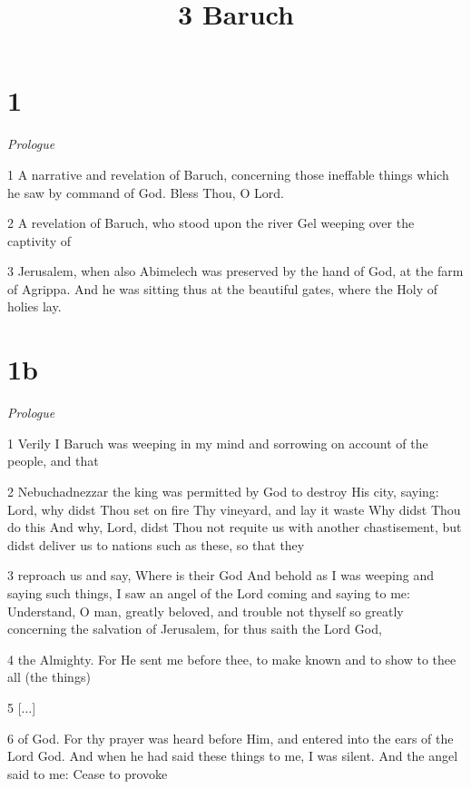 

\title{3 Baruch}

\chapter{1}

\par \textit{Prologue}

\par 1 A narrative and revelation of Baruch, concerning those ineffable things which he saw by command of God. Bless Thou, O Lord.

\par 2 A revelation of Baruch, who stood upon the river Gel weeping over the captivity of 

\par 3 Jerusalem, when also Abimelech was preserved by the hand of God, at the farm of Agrippa. And he was sitting thus at the beautiful gates, where the Holy of holies lay.

\chapter{1b}

\par \textit{Prologue}

\par 1 Verily I Baruch was weeping in my mind and sorrowing on account of the people, and that

\par 2 Nebuchadnezzar the king was permitted by God to destroy His city, saying: Lord, why didst Thou set on fire Thy vineyard, and lay it waste Why didst Thou do this And why, Lord, didst Thou not requite us with another chastisement, but didst deliver us to nations such as these, so that they

\par 3 reproach us and say, Where is their God And behold as I was weeping and saying such things, I saw an angel of the Lord coming and saying to me: Understand, O man, greatly beloved, and trouble not thyself so greatly concerning the salvation of Jerusalem, for thus saith the Lord God,

\par 4 the Almighty. For He sent me before thee, to make known and to show to thee all (the things) 

\par 5 [...]

\par 6 of God. For thy prayer was heard before Him, and entered into the ears of the Lord God. And when he had said these things to me, I was silent. And the angel said to me: Cease to provoke

